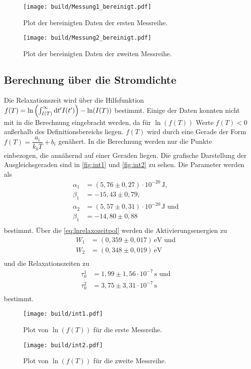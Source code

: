 \begin{figure}[H]
    \centering
    \texttt{[image: build/Messung1\_bereinigt.pdf]}
    \caption{Plot der bereinigten Daten der ersten Messreihe.}
    \label{fig:BereinigteDaten1}
\end{figure}
\begin{figure}[H]
    \centering
    \texttt{[image: build/Messung2\_bereinigt.pdf]}
    \caption{Plot der bereinigten Daten der zweiten Messreihe.}
    \label{fig:BereinigteDaten2}
\end{figure}
\subsection{Berechnung über die Stromdichte}
\label{sec:BerechnungStromdichte}

Die Relaxationszeit wird über die Hilfsfunktion $f(T) = \ln \left(\int^\infty_{I(T)} \mathrm{d} t' I(t') \right) - \ln (I(T))$ bestimmt.
Einige der Daten konnten nicht mit in die Berechnung eingebracht werden,
da für $\ln \left(f(T)\right)$ Werte $f(T) < 0$ außerhalb des Definitionsbereichs liegen. 
$f(T)$ wird durch eine Gerade der Form $f(T) = \dfrac{a_i}{k_b T} + b_i$ genähert.
In die Berechnung werden nur die Punkte einbezogen, die annähernd auf einer Geraden liegen.
Die grafische Darstellung der Ausgleichsgeraden sind in \autoref{fig:int1} und \autoref{fig:int2} zu sehen.
Die Parameter werden als 
\begin{align*}
    \alpha_1 &=   (5,76   \pm 0,27) \cdot 10^{-20} \, \unit{\joule} , \\
    \beta_1 &= -15,43   \pm 0,79                                ,\\
    \alpha_2 &=   (5,57   \pm 0,31) \cdot 10^{-20} \,\unit{\joule} \, \, \text{und}\\
    \beta_1 &= -14,80   \pm 0,88\\
\end{align*}
bestimmt.
Über die \eqref{eq:lnrelaxozeitpol} werden die Aktivierungsenergien zu 
\begin{align*}   
    W_1 &=   (0,359 \pm 0,017) \, \unit{\electronvolt} \, \, \text{und}  \\
    W_2 &=   (0,348 \pm 0,019) \, \unit{\electronvolt} \\
\end{align*}
und die Relaxationszeiten zu 
\begin{align*}
    \tau_{0}^{1} &=   1,99 \pm 1,56 \cdot 10^{-7} \, \unit{\second} \, \, \text{und} \\
    \tau_{0}^{2} &=   3,75 \pm 3,31 \cdot 10^{-7} \, \unit{\second}         \\
\end{align*}
bestimmt.
\begin{figure}[H]
    \centering
    \texttt{[image: build/int1.pdf]}
    \caption{Plot von $\ln \left(f(T)\right)$ für die erste Messreihe.}
    \label{fig:int1}
\end{figure}
\begin{figure}[H]
    \centering
    \texttt{[image: build/int2.pdf]}
    \caption{Plot von $\ln \left(f(T)\right)$ für die zweite Messreihe.}
    \label{fig:int2}
\end{figure}



